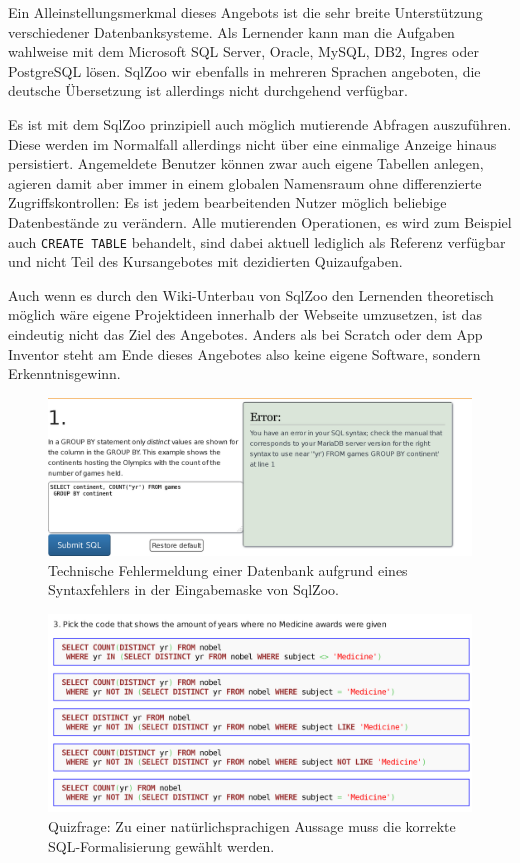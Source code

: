 Ein Alleinstellungsmerkmal dieses Angebots ist die sehr breite Unterstützung verschiedener Datenbanksysteme. Als Lernender kann man die Aufgaben wahlweise mit dem Microsoft SQL Server, Oracle, MySQL, DB2, Ingres oder PostgreSQL lösen. SqlZoo wir ebenfalls in mehreren Sprachen angeboten, die deutsche Übersetzung ist allerdings nicht durchgehend verfügbar.

Es ist mit dem SqlZoo prinzipiell auch möglich mutierende Abfragen auszuführen. Diese werden im Normalfall allerdings nicht über eine einmalige Anzeige hinaus persistiert. Angemeldete Benutzer können zwar auch eigene Tabellen anlegen, agieren damit aber immer in einem globalen Namensraum ohne differenzierte Zugriffskontrollen: Es ist jedem bearbeitenden Nutzer möglich beliebige Datenbestände zu verändern. Alle mutierenden Operationen, es wird zum Beispiel auch \lstinline{CREATE TABLE} behandelt, sind dabei aktuell lediglich als Referenz verfügbar und nicht Teil des Kursangebotes mit dezidierten Quizaufgaben.

Auch wenn es durch den Wiki-Unterbau von SqlZoo den Lernenden theoretisch möglich wäre eigene Projektideen innerhalb der Webseite umzusetzen, ist das eindeutig nicht das Ziel des Angebotes. Anders als bei Scratch oder dem App Inventor steht am Ende dieses Angebotes also keine eigene Software, sondern Erkenntnisgewinn.

\begin{figure}[p]
  \centering \includegraphics[width=\textwidth]{images/related-work-sql-zoo-error.png}
  \caption{Technische Fehlermeldung einer Datenbank aufgrund eines Syntaxfehlers in der Eingabemaske von SqlZoo.}
  \label{fig:sqlzoo-check-result}
\end{figure}

\begin{figure}[p]
  \centering \includegraphics[width=\textwidth]{images/related-work-sql-zoo-quiz-select-sql.png}
  \caption{Quizfrage: Zu einer natürlichsprachigen Aussage muss die korrekte SQL-Formalisierung gewählt werden.}
  \label{fig:sqlzoo-quiz-sql-formalization}
\end{figure}

